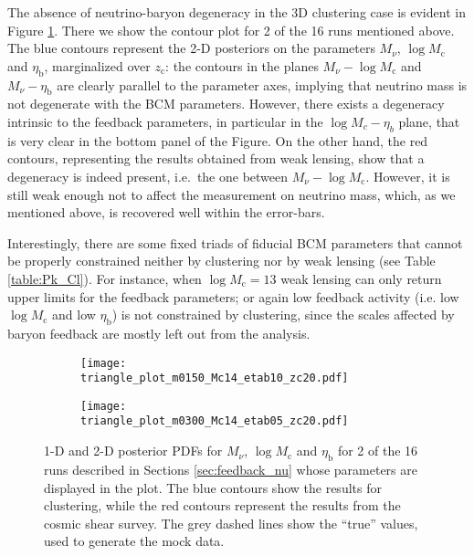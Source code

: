 \documentclass[a4paper,11pt]{article}
\begin{document}
The absence of neutrino-baryon degeneracy in the 3D clustering case is evident in Figure \ref{fig:triangle_4p}.  There we show the contour plot for 2 of the 16 runs mentioned above. The blue contours represent the 2-D posteriors on the parameters $M_\nu$, $\log M_\mathrm c$ and $\eta_\mathrm b$, marginalized over $z_\mathrm c$: the contours in the planes $M_\nu-\log M_\mathrm c$ and $M_\nu-\eta_\mathrm b$ are clearly parallel to the parameter axes, implying that neutrino mass is not degenerate with the BCM parameters.
However, there exists a degeneracy intrinsic to the feedback parameters, in particular in the $\log M_c-\eta_b$ plane, that is very clear in the bottom panel of the Figure.
On the other hand, the red contours, representing the results obtained from weak lensing, show that a degeneracy is indeed present, i.e.~the one between $M_\nu-\log M_\mathrm c$.
However, it is still weak enough not to affect the measurement on neutrino mass, which, as we mentioned above, is recovered well within the error-bars. 

Interestingly, there are some fixed triads of fiducial BCM parameters that cannot be properly constrained neither by clustering nor by weak lensing (see Table \ref{table:Pk_Cl}).
For instance, when $\log M_\mathrm c=13$ weak lensing can only return upper limits for the feedback parameters; or again low feedback activity (i.e. low $\log M_\mathrm c$ and low $\eta_\mathrm b$) is not constrained by clustering, since the scales affected by baryon feedback are mostly left out from the analysis.

\begin{figure}[t!]
        \centering
        \begin{subfigure}[b]{0.62\textwidth}
            \centering
            \texttt{[image: triangle\_plot\_m0150\_Mc14\_etab10\_zc20.pdf]}
        \end{subfigure}
        \hspace{-.7\baselineskip}
        \begin{subfigure}[b]{0.62\textwidth}  
            \centering 
            \texttt{[image: triangle\_plot\_m0300\_Mc14\_etab05\_zc20.pdf]}
        \end{subfigure}
\caption{1-D and 2-D posterior PDFs for $M_\nu$, $\log M_\mathrm c$ and $\eta_\mathrm b$ for 2 of the 16 runs described in Sections \ref{sec:feedback_nu} whose parameters are displayed in the plot.
The blue contours show the results for clustering, while the red contours represent the results from the cosmic shear survey.
The grey dashed lines show the ``true'' values, used to generate the mock data.}
\label{fig:triangle_4p}
\end{figure}
\end{document}
